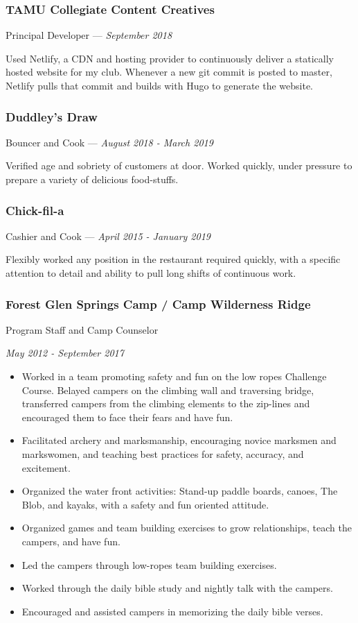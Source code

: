 \documentclass[letterpaper,10pt]{article}
\providecommand{\tightlist}
  {\setlength{\itemsep}{4pt}\setlength{\parskip}{0pt}}
\begin{document}
    \subsubsection{TAMU Collegiate Content Creatives}
    \hfill Principal Developer --- \emph{September 2018}

    Used Netlify, a CDN and hosting provider to continuously deliver a statically hosted website for my club. Whenever a new git commit is posted to master, Netlify pulls that commit and builds with Hugo to generate the website.

    \subsubsection{Duddley's Draw}
    \hfill Bouncer and Cook --- \emph{August 2018 - March 2019}

    Verified age and sobriety of customers at door. Worked quickly, under pressure to prepare a variety of delicious food-stuffs.


    \subsubsection{Chick-fil-a}
    \hfill Cashier and Cook --- \emph{April 2015 - January 2019}

    Flexibly worked any position in the restaurant required quickly, with a specific attention to detail and ability to pull long shifts of continuous work.

    \subsubsection{Forest Glen Springs Camp / Camp Wilderness Ridge}
    \hfill Program Staff and Camp Counselor 
    
    \hfill \emph{May 2012 - September 2017}

    \begin{itemize}
        \tightlist{}
        \item
        Worked in a team promoting safety and fun on the low ropes Challenge Course.
        Belayed campers on the climbing wall and traversing bridge, transferred campers from the climbing elements to the zip-lines and encouraged them to face their fears and have fun.
        \item
        Facilitated archery and marksmanship, encouraging novice marksmen and markswomen, and teaching best practices for safety, accuracy, and excitement.
        \item
        Organized the water front activities: Stand-up paddle boards, canoes, The Blob, and kayaks, with a safety and fun oriented attitude.
        \item
        Organized games and team building exercises to grow relationships, teach the campers, and have fun.
        \item
        Led the campers through low-ropes team building exercises.
        \item
        Worked through the daily bible study and nightly talk with the campers.
        \item
        Encouraged and assisted campers in memorizing the daily bible verses.
    \end{itemize}
\end{document}
